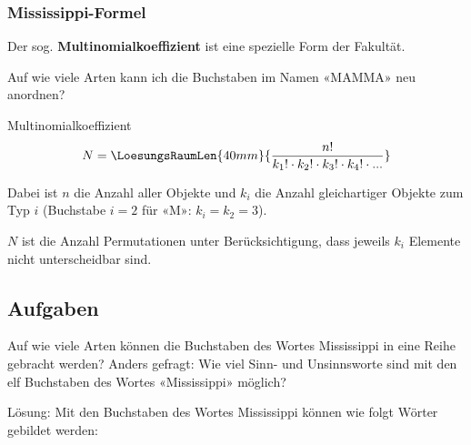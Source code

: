 \newpage



\subsubsection{Mississippi-Formel}
Der sog. \textbf{Multinomialkoeffizient} ist eine spezielle Form der Fakultät.

Auf wie viele Arten kann ich die Buchstaben im Namen «MAMMA» neu anordnen?


\begin{gesetz}{Multinomialkoeffizient}{}
  $$N = \LoesungsRaumLen{40mm}{\frac{n!}{k_1! \cdot{} k_2! \cdot{} k_3! \cdot{} k_4! \cdot{}  ...}}$$

  \noTRAINER{\vspace{6mm}}

  Dabei ist $n$ die Anzahl aller Objekte und $k_i$ die Anzahl
  gleichartiger Objekte zum Typ $i$ (\zB Buchstabe $i=2$  für «M»: $k_i=k_2=3$).

  $N$ ist die Anzahl Permutationen unter Berücksichtigung, dass jeweils $k_i$ Elemente nicht unterscheidbar sind.
\end{gesetz}

\newpage
\subsection*{Aufgaben}

Auf wie viele Arten können die Buchstaben des Wortes Mississippi in
eine Reihe gebracht werden? Anders gefragt: Wie viel Sinn- und
Unsinnsworte sind mit den elf Buchstaben des Wortes «Mississippi»
möglich?

Lösung: Mit den Buchstaben des Wortes
{\color{red}M}{\color{blue}i}{\color{orange}ss}{\color{blue}i}{\color{orange}ss}{\color{blue}i}{\color{violet}pp}{\color{blue}i}
können wie folgt Wörter gebildet werden:

